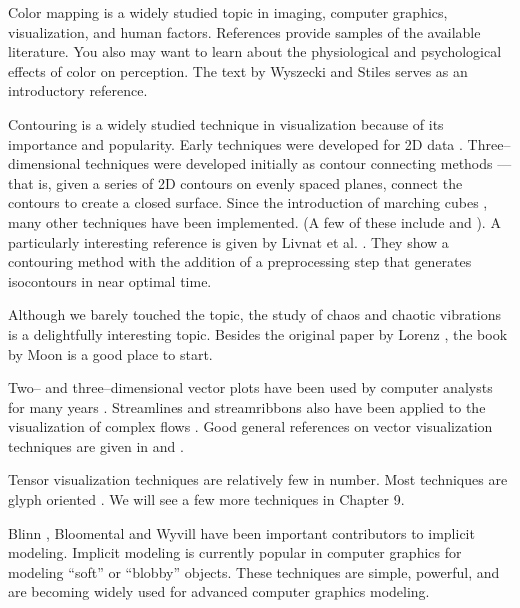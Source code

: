 Color mapping is a widely studied topic in imaging, computer graphics, visualization, and human factors. References \cite{Durrett87} \cite{Ware88} \cite{Rheingans92} provide samples of the available literature. You also may want to learn about the physiological and psychological effects of color on perception. The text by Wyszecki and Stiles \cite{Wyszecki82} serves as an introductory reference.

Contouring is a widely studied technique in visualization because of its importance and popularity. Early techniques were developed for 2D data \cite{Watson92}. Three--dimensional techniques were developed initially as contour connecting methods \cite{Fuchs77} --- that is, given a series of 2D contours on evenly spaced planes, connect the contours to create a closed surface. Since the introduction of marching cubes \cite{Lorensen87}, many other techniques have been implemented. (A few of these include \cite{Nielson91} \cite{Montani94} and \cite{Durst88} ). A particularly interesting reference is given by Livnat et al. \cite{Livnat96}. They show a contouring method with the addition of a preprocessing step that generates isocontours in near optimal time.

Although we barely touched the topic, the study of chaos and chaotic vibrations is a delightfully interesting topic. Besides the original paper by Lorenz \cite{Lorenz63}, the book by Moon \cite{Moon87} is a good place to start.

Two-- and three--dimensional vector plots have been used by computer analysts for many years \cite{Fuller80}. Streamlines and streamribbons also have been applied to the visualization of complex flows \cite{Volpe89}. Good general references on vector visualization techniques are given in \cite{Helman90} and \cite{Richter90}.

Tensor visualization techniques are relatively few in number. Most techniques are glyph oriented \cite{Haber90} \cite{deLeeuw93}. We will see a few more techniques in Chapter 9.

Blinn \cite{Blinn82}, Bloomental \cite{Bloomenthal88} \cite{Bloomenthal97} and Wyvill \cite{Wyvill86} have been important contributors to implicit modeling. Implicit modeling is currently popular in computer graphics for modeling ``soft'' or ``blobby'' objects. These techniques are simple, powerful, and are becoming widely used for advanced computer graphics modeling.

\printbibliography


